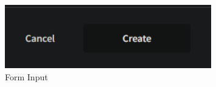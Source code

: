 \begin{figure}[H]
    \centering
    \includegraphics[width=0.8\textwidth]{assets/create.png}
    \caption{Form Input}
\end{figure}